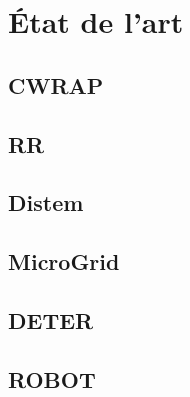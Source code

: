 \section{État de l'art}
\label{section:sota}
\subsection{CWRAP}

\subsection{RR}
\subsection{Distem}
 
\subsection{MicroGrid}
\subsection{DETER}
\subsection{ROBOT}
